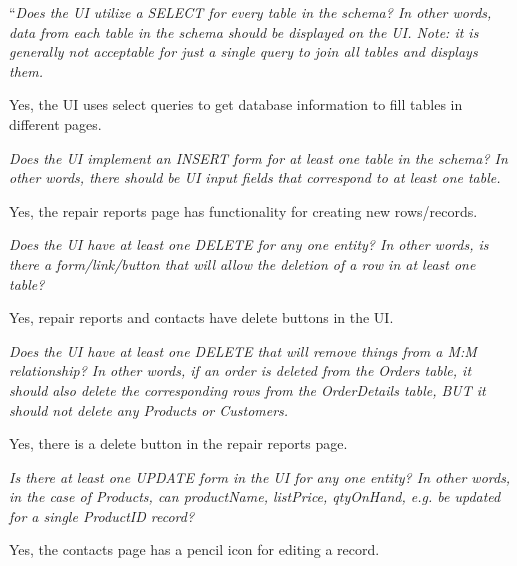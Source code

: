 \documentclass{article}
\begin{document}
\vspace{0.2cm}
\begin{tcolorbox}[colback=secondarycolor, colframe=primarycolor, title=\textbf{Step 3: Peer Review 4 - Daniel Guardado}]
``\textit{Does the UI utilize a SELECT for every table in the schema? In other words, data from each table in the schema should be displayed on the UI. Note: it is generally not acceptable for just a single query to join all tables and displays them.}

\vspace{0.05cm}
Yes, the UI uses select queries to get database information to fill tables in different pages.

\vspace{0.2cm}
\textit{Does the UI implement an INSERT form for at least one table in the schema? In other words, there should be UI input fields that correspond to at least one table.}

\vspace{0.05cm}
Yes, the repair reports page has functionality for creating new rows/records.

\vspace{0.2cm}
\textit{Does the UI have at least one DELETE for any one entity? In other words, is there a form/link/button that will allow the deletion of a row in at least one table?}

\vspace{0.05cm}
Yes, repair reports and contacts have delete buttons in the UI.

\vspace{0.2cm}
\textit{Does the UI have at least one DELETE that will remove things from a M:M relationship? In other words, if an order is deleted from the Orders table, it should also delete the corresponding rows from the OrderDetails table, BUT it should not delete any Products or Customers.}

\vspace{0.05cm}
Yes, there is a delete button in the repair reports page.

\vspace{0.2cm}
\textit{Is there at least one UPDATE form in the UI for any one entity? In other words, in the case of Products, can productName, listPrice, qtyOnHand, e.g. be updated for a single ProductID record?}

\vspace{0.05cm}
Yes, the contacts page has a pencil icon for editing a record.


\end{tcolorbox}
\end{document}

